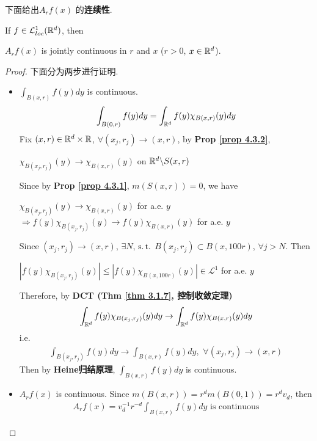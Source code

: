 	\vspace{2em}
	下面给出$A_{r}f(x)$ 的\textbf{连续性}.
	\begin{lemma}\label{lemma 4.3.1}
		If $f \in \mathcal{L}_{loc}^{1}(\mathbb{R}^d)$, then
		\begin{center}
			$A_{r}f(x)$ is jointly continuous in $r$ and $x$ ($r > 0$, $x \in \mathbb{R}^d$).
		\end{center}
	
		\vspace{4em}
		\begin{proof}
			下面分为两步进行证明.
			\begin{itemize}
				\item $\int_{B(x , r)}{f(y) dy}$ is continuous. 
				\begin{align}
					\int_{B(0 , r)}{f(y) dy}
					= \int_{\mathbb{R}^d}{f(y) \chi_{B(x , r)}(y) dy}
				\end{align}
				Fix $(x , r) \in \mathbb{R}^d \times \mathbb{R}$, $\forall (x_j , r_j) \to (x , r)$, by \textbf{Prop \ref{prop 4.3.2}},
				\begin{center}
					$\chi_{B(x_j , r_j)}(y) \to \chi_{B(x , r)}(y)$ on $\mathbb{R}^d \backslash S(x , r)$
				\end{center}
				Since by \textbf{Prop \ref{prop 4.3.1}}, $m(S(x , r)) = 0$, we have
				\begin{center}
					$\chi_{B(x_j , r_j)}(y) \to \chi_{B(x , r)}(y)$ for a.e. $y$ \\
					$\Rightarrow f(y) \chi_{B(x_j , r_j)}(y) \to f(y) \chi_{B(x , r)}(y)$ for a.e. $y$
				\end{center}
				Since $(x_j , r_j) \to (x , r)$, $\exists N$, $\operatorname{s.t.}$ $B(x_j , r_j) \subset B(x , 100r)$, $\forall j > N$. Then
				\begin{center}
					$\left| f(y) \chi_{B(x_j , r_j)}(y) \right| \leq \left| f(y) \chi_{B(x , 100r)}(y) \right| \in \mathcal{L}^{1}$ for a.e. $y$
				\end{center}
				Therefore, by \textbf{DCT (Thm \ref{thm 3.1.7}, 控制收敛定理)}
				\begin{align}
					\int_{\mathbb{R}^d}{f(y) \chi_{B(x_j , r_j)}(y) dy} \to \int_{\mathbb{R}^d}{f(y) \chi_{B(x , r)}(y) dy}
				\end{align}
				i.e.
				\begin{align}
					\int_{B(x_j , r_j)}{f(y) dy} \to \int_{B(x , r)}{f(y) dy} , \,\, \forall (x_j , r_j) \to (x , r)
				\end{align}
				Then by \textbf{Heine归结原理}, $\int_{B(x , r)}{f(y) dy}$ is continuous.
				
				\vspace{2em}
				
				\item $A_{r}f(x)$ is continuous. Since $m(B(x , r)) = r^d m(B(0 , 1)) = r^d v_d$, then
				\begin{align}
					A_{r}f(x) = v_{d}^{-1} r^{-d} \int_{B(x , r)}{f(y) dy} \,\, \text{is continuous}
				\end{align}
			\end{itemize}
		\end{proof}
	\end{lemma}

